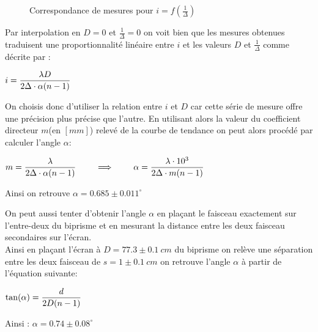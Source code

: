\documentclass[11pt, openright]{book}
\begin{document}
			\begin{figure}[ht!]
				\centering
				\caption{Correspondance de mesures pour $i=f(\frac{1}{\Delta })$}
			\end{figure}
		
			Par interpolation en $D =0$ et $\frac{1}{\Delta }=0$ on voit bien que les mesures obtenues traduisent une proportionnalité linéaire entre $i$ et les valeurs $D$ et $\frac{1}{\Delta }$ comme décrite par : \\
			\centerline{$\displaystyle{i=\frac{\lambda D}{2\Delta \cdot  \alpha (n-1)}}$}

			On choisis donc d'utiliser la relation entre $i$ et $D$ car cette série de mesure offre une précision plus précise que l'autre. En utilisant alors la valeur du coefficient directeur $m$(en $[mm]$) relevé de la courbe de tendance on peut alors procédé par calculer l'angle $\alpha $: \\
			\centerline{$\displaystyle{m=\frac{\lambda }{2\Delta \cdot \alpha (n-1)}}\qquad\implies\qquad \alpha =\frac{\lambda\cdot 10^{3} }{2\Delta \cdot m(n-1)} $}
			Ainsi on retrouve $\alpha =0.685\pm 0.011^{\circ}$

			On peut aussi tenter d'obtenir l'angle $\alpha $ en plaçant le faisceau exactement sur l'entre-deux du biprisme et en mesurant la distance entre les deux faisceau secondaires sur l'écran. \\
			Ainsi en plaçant l'écran à $D=77.3\pm 0.1\ cm $ du biprisme on relève une séparation entre les deux faisceau de $s=1\pm 0.1\ cm$ on retrouve l'angle $\alpha $ à partir de l'équation suivante: \\
			\centerline{$\displaystyle{\tan(\alpha) =\frac{d}{2D(n-1)} }$}
			Ainsi : $\alpha =0.74\pm 0.08^{\circ}$
\end{document}
